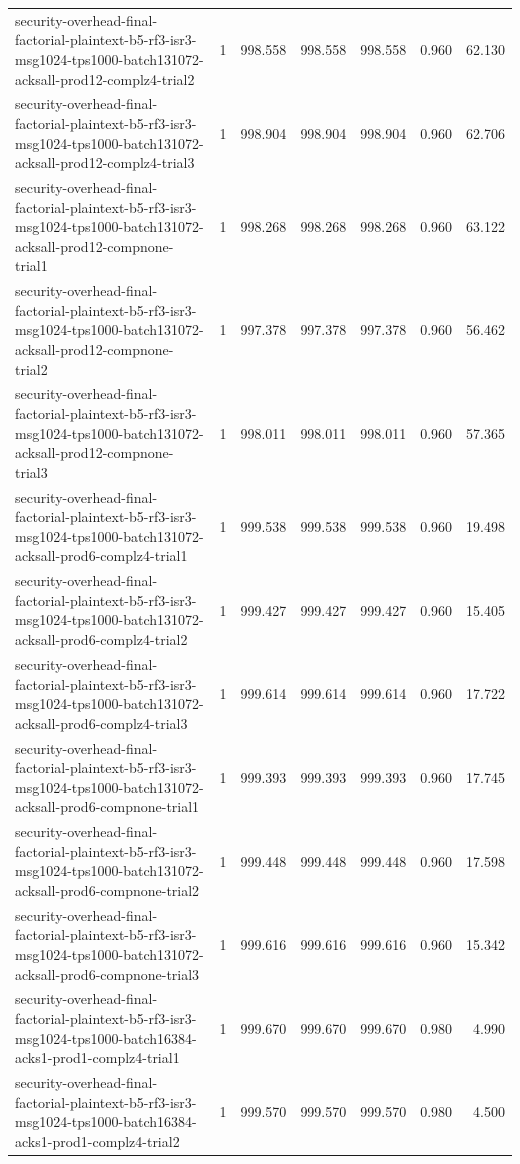 \begin{tabular}{lrrrrrr}
security-overhead-final-factorial-plaintext-b5-rf3-isr3-msg1024-tps1000-batch131072-acksall-prod12-complz4-trial2 & 1 & 998.558 & 998.558 & 998.558 & 0.960 & 62.130 \\
security-overhead-final-factorial-plaintext-b5-rf3-isr3-msg1024-tps1000-batch131072-acksall-prod12-complz4-trial3 & 1 & 998.904 & 998.904 & 998.904 & 0.960 & 62.706 \\
security-overhead-final-factorial-plaintext-b5-rf3-isr3-msg1024-tps1000-batch131072-acksall-prod12-compnone-trial1 & 1 & 998.268 & 998.268 & 998.268 & 0.960 & 63.122 \\
security-overhead-final-factorial-plaintext-b5-rf3-isr3-msg1024-tps1000-batch131072-acksall-prod12-compnone-trial2 & 1 & 997.378 & 997.378 & 997.378 & 0.960 & 56.462 \\
security-overhead-final-factorial-plaintext-b5-rf3-isr3-msg1024-tps1000-batch131072-acksall-prod12-compnone-trial3 & 1 & 998.011 & 998.011 & 998.011 & 0.960 & 57.365 \\
security-overhead-final-factorial-plaintext-b5-rf3-isr3-msg1024-tps1000-batch131072-acksall-prod6-complz4-trial1 & 1 & 999.538 & 999.538 & 999.538 & 0.960 & 19.498 \\
security-overhead-final-factorial-plaintext-b5-rf3-isr3-msg1024-tps1000-batch131072-acksall-prod6-complz4-trial2 & 1 & 999.427 & 999.427 & 999.427 & 0.960 & 15.405 \\
security-overhead-final-factorial-plaintext-b5-rf3-isr3-msg1024-tps1000-batch131072-acksall-prod6-complz4-trial3 & 1 & 999.614 & 999.614 & 999.614 & 0.960 & 17.722 \\
security-overhead-final-factorial-plaintext-b5-rf3-isr3-msg1024-tps1000-batch131072-acksall-prod6-compnone-trial1 & 1 & 999.393 & 999.393 & 999.393 & 0.960 & 17.745 \\
security-overhead-final-factorial-plaintext-b5-rf3-isr3-msg1024-tps1000-batch131072-acksall-prod6-compnone-trial2 & 1 & 999.448 & 999.448 & 999.448 & 0.960 & 17.598 \\
security-overhead-final-factorial-plaintext-b5-rf3-isr3-msg1024-tps1000-batch131072-acksall-prod6-compnone-trial3 & 1 & 999.616 & 999.616 & 999.616 & 0.960 & 15.342 \\
security-overhead-final-factorial-plaintext-b5-rf3-isr3-msg1024-tps1000-batch16384-acks1-prod1-complz4-trial1 & 1 & 999.670 & 999.670 & 999.670 & 0.980 & 4.990 \\
security-overhead-final-factorial-plaintext-b5-rf3-isr3-msg1024-tps1000-batch16384-acks1-prod1-complz4-trial2 & 1 & 999.570 & 999.570 & 999.570 & 0.980 & 4.500 \\

\end{tabular}
